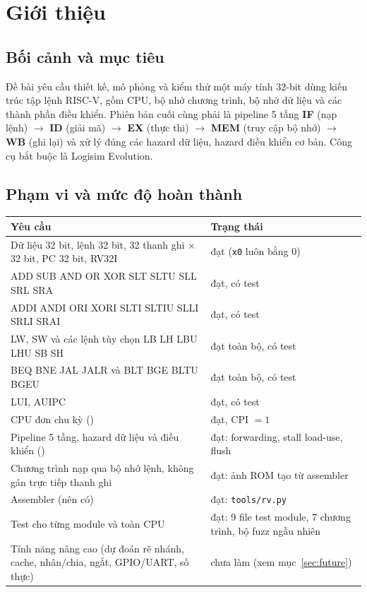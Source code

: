 \documentclass[11pt,a4paper]{article}
\newcommand{\sig}[1]{\texttt{\detokenize{#1}}}
\begin{document}
\tableofcontents
\newpage

\section{Giới thiệu}
\subsection{Bối cảnh và mục tiêu}
Đề bài yêu cầu thiết kế, mô phỏng và kiểm thử một máy tính 32-bit dùng kiến trúc tập lệnh RISC-V, gồm CPU, bộ nhớ chương trình, bộ nhớ dữ liệu và các thành phần điều khiển.
Phiên bản cuối cùng phải là pipeline 5 tầng \textbf{IF} (nạp lệnh) $\rightarrow$ \textbf{ID} (giải mã) $\rightarrow$ \textbf{EX} (thực thi) $\rightarrow$ \textbf{MEM} (truy cập bộ nhớ)
$\rightarrow$ \textbf{WB} (ghi lại) và xử lý đúng các hazard dữ liệu, hazard điều khiển cơ bản. Công cụ bắt buộc là Logisim Evolution.

\subsection{Phạm vi và mức độ hoàn thành}
\begin{center}
\small
\begin{tabularx}{\textwidth}{@{}>{\raggedright\arraybackslash}p{5.6cm}X@{}}
\toprule
\textbf{Yêu cầu} & \textbf{Trạng thái}\\
\midrule
Dữ liệu 32 bit, lệnh 32 bit, 32 thanh ghi $\times$ 32 bit, PC 32 bit, RV32I & đạt (\texttt{x0} luôn bằng 0)\\
ADD SUB AND OR XOR SLT SLTU SLL SRL SRA & đạt, có test\\
ADDI ANDI ORI XORI SLTI SLTIU SLLI SRLI SRAI & đạt, có test\\
LW, SW và các lệnh tùy chọn LB LH LBU LHU SB SH & đạt toàn bộ, có test\\
BEQ BNE JAL JALR và BLT BGE BLTU BGEU & đạt toàn bộ, có test\\
LUI, AUIPC & đạt, có test\\
CPU đơn chu kỳ (\sig{main}) & đạt, CPI $=1$\\
Pipeline 5 tầng, hazard dữ liệu và điều khiển (\sig{Pipeline}) & đạt: forwarding, stall load-use, flush\\
Chương trình nạp qua bộ nhớ lệnh, không gán trực tiếp thanh ghi & đạt: ảnh ROM tạo từ assembler\\
Assembler (nên có) & đạt: \texttt{tools/rv.py}\\
Test cho từng module và toàn CPU & đạt: 9 file test module, 7 chương trình, bộ fuzz ngẫu nhiên\\
Tính năng nâng cao (dự đoán rẽ nhánh, cache, nhân/chia, ngắt, GPIO/UART, số thực) & chưa làm (xem mục~\ref{sec:future})\\
\bottomrule
\end{tabularx}
\end{center}
\end{document}

